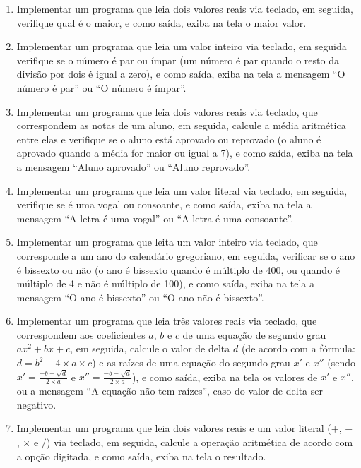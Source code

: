 \documentclass[11pt]{article}
\begin{document}
\begin{enumerate}
	\item Implementar um programa que leia dois valores reais via teclado, em seguida, verifique qual é o
	maior, e como saída, exiba na tela o maior valor.
	
	\item Implementar um programa que leia um valor inteiro via teclado, em seguida verifique se o número
	é par ou ímpar (um número é par quando o resto da divisão por dois é igual a zero), e como
	saída, exiba na tela a mensagem ``O número é par'' ou ``O número é ímpar''.
	
	\item Implementar um programa que leia dois valores reais via teclado, que correspondem as notas de
	um aluno, em seguida, calcule a média aritmética entre elas e verifique se o aluno está aprovado
	ou reprovado (o aluno é aprovado quando a média for maior ou igual a 7), e como saída, exiba
	na tela a mensagem ``Aluno aprovado'' ou ``Aluno reprovado''.
	
	\item Implementar um programa que leia um valor literal via teclado, em seguida, verifique se é uma
	vogal ou consoante, e como saída, exiba na tela a mensagem ``A letra é uma vogal'' ou ``A letra é
	uma consoante''.
	
	\item Implementar um programa que leita um valor inteiro via teclado, que corresponde a um ano do
	calendário gregoriano, em seguida, verificar se o ano é bissexto ou não (o ano é bissexto quando
	é múltiplo de 400, ou quando é múltiplo de 4 e não é múltiplo de 100), e como saída, exiba na
	tela a mensagem ``O ano é bissexto'' ou ``O ano não é bissexto''.
	
	\item  Implementar um programa que leia três valores reais via teclado, que correspondem aos
	coeficientes $a$, $b$ e $c$ de uma equação de segundo grau $ax^{2} + bx + c$, em seguida, calcule o valor
	de delta $d$ (de acordo com a fórmula: $d = b^{2} - 4 \times a \times c$) e as raízes de uma equação do segundo
	grau $x'$ e $x''$ (sendo $x'= \frac{-b + \sqrt{d}}{2 \times a}$ e $x''= \frac{-b - \sqrt{d}}{2 \times a}$), e como saída, exiba na tela os valores de $x'$
	e $x''$, ou a mensagem ``A equação não tem raízes'', caso do valor de delta ser negativo.
	
	\item Implementar um programa que leia dois valores reais e um valor literal ($+$, $-$ , $\times$ e $/$) via teclado,
	em seguida, calcule a operação aritmética de acordo com a opção digitada, e como saída, exiba
	na tela o resultado.
	

\end{enumerate}
\end{document}
